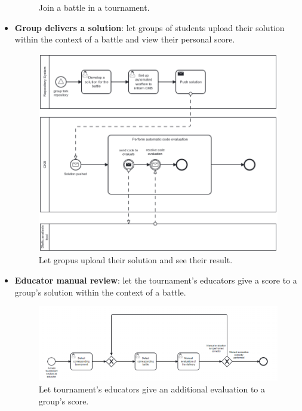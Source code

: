 \documentclass[../RASD.tex]{subfiles}
\begin{document}
\begin{itemize}
{\begin{figure}[h]
            \caption{Join a battle in a tournament.}
            \label{img:bpmn_enroll_in_a_battle}
        \end{figure}
        \newpage
        }
        \restoregeometry
        \item {\textbf{Group delivers a solution}: let groups of students upload their solution\\
        within the context of a battle and view their personal score.
        \begin{figure}[h!]
            \centering
            \includegraphics[width=\textwidth]{../assets/section_2/group_upload_solution_definitive.png}
            \caption{Let gropus upload their solution and see their result.}
            \label{img:bpmn_group_upload_solution_and_see_results}
        \end{figure}
        \newpage
        }
        \item {\textbf{Educator manual review}: let the tournament's educators give a score to a group's solution within the context of a battle.
        \begin{figure}[h!]
            \centering
            \includegraphics[width=\textwidth]{../assets/section_2/educator_code_review_definitive.png}
            \caption{Let tournament's educators give an additional evaluation to a group's score.}
            \label{img:bpmn_educator_code_review}
        \end{figure}
        \newpage
        }
    \end{itemize}
    \newpage
    \restoregeometry
\end{document}
